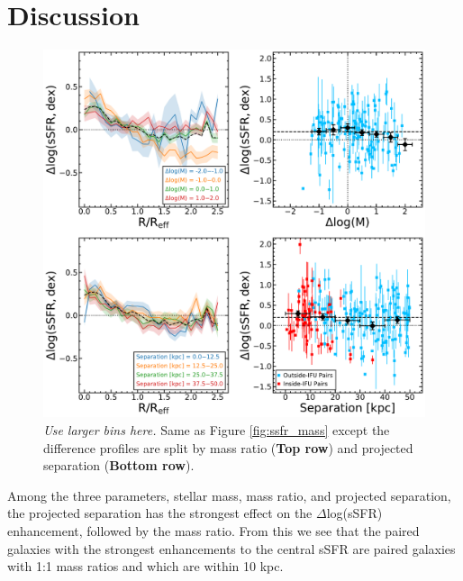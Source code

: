 \documentclass[iop,revtex4,twocolumn,apj,numberedappendix,appendixfloats]{emulateapj}
\begin{document}
\section{Discussion}\label{sec:disc}

\begin{figure}
\centering
\includegraphics[width=\linewidth]{fig/ssfr_partial.pdf}
\caption[]{{\it Use larger bins here.} Same as Figure \ref{fig:ssfr_mass} except the difference profiles are split by mass ratio (\textbf{Top row}) and projected separation (\textbf{Bottom row}). }
\label{fig:ssfr_dmsep}
\end{figure}

Among the three parameters, stellar mass, mass ratio, and projected separation, the projected separation has the strongest effect on the $\Delta$log(sSFR) enhancement, followed by the mass ratio. From this we see that the paired galaxies with the strongest enhancements to the central sSFR are paired galaxies with 1:1 mass ratios and  which are within 10 kpc. 
\end{document}
